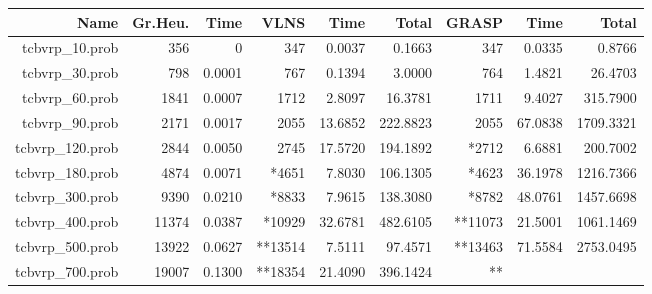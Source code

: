 \documentclass[a4paper]{scrartcl}
\begin{document}




\begin{tabular}{r | r | r | r | r | r | r | r | r}
\hline
Name & Gr.Heu. & Time &  VLNS & Time & Total & GRASP & Time & Total \\
\hline \hline 
tcbvrp\_10.prob & 356 & 0 & 347 & 0.0037 & 0.1663 & 347 & 0.0335 & 0.8766 \\
\hline
tcbvrp\_30.prob & 798 & 0.0001 & 767 & 0.1394 & 3.0000 & 764 & 1.4821 & 26.4703 \\
\hline
tcbvrp\_60.prob & 1841 & 0.0007 & 1712 & 2.8097 & 16.3781 & 1711 & 9.4027 & 315.7900 \\
\hline
tcbvrp\_90.prob & 2171 & 0.0017 & 2055 & 13.6852 & 222.8823 & 2055 & 67.0838 & 1709.3321\\
\hline
tcbvrp\_120.prob & 2844 & 0.0050 & 2745 & 17.5720 & 194.1892 & *2712 & 6.6881 & 200.7002 \\
\hline
tcbvrp\_180.prob & 4874 & 0.0071 & *4651 & 7.8030 & 106.1305 & *4623 & 36.1978 & 1216.7366 \\
\hline
tcbvrp\_300.prob & 9390 & 0.0210 & *8833 & 7.9615 & 138.3080 & *8782 & 48.0761 & 1457.6698 \\
\hline
tcbvrp\_400.prob & 11374 & 0.0387 & *10929 & 32.6781 & 482.6105 & **11073 & 21.5001 & 1061.1469 \\
\hline
tcbvrp\_500.prob & 13922 & 0.0627 & **13514 & 7.5111 & 97.4571 & **13463 & 71.5584 & 2753.0495 \\
\hline
tcbvrp\_700.prob & 19007 & 0.1300 & **18354 & 21.4090 & 396.1424 & ** \\
\hline
\end{tabular}




\end{document}
